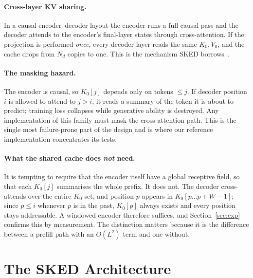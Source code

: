 \documentclass[10pt,conference]{IEEEtran}
\begin{document}
\paragraph{Cross-layer KV sharing.} In a causal encoder--decoder layout the encoder
runs a full causal pass and the decoder attends to the encoder's final-layer states
through cross-attention. If the projection is performed \emph{once}, every decoder
layer reads the same $K_0, V_0$, and the cache drops from $N_d$ copies to one. This is
the mechanism SKED borrows~\cite{yoco}.

\paragraph{The masking hazard.} The encoder is causal, so $K_0[j]$ depends only on
tokens $\leq j$. If decoder position $i$ is allowed to attend to $j > i$, it reads a
summary of the token it is about to predict; training loss collapses while generative
ability is destroyed. Any implementation of this family must mask the cross-attention
path. This is the single most failure-prone part of the design and is where our
reference implementation concentrates its tests.

\paragraph{What the shared cache does \emph{not} need.} It is tempting to require that
the encoder itself have a global receptive field, so that each $K_0[j]$ summarises the
whole prefix. It does not. The decoder cross-attends over the entire $K_0$ set, and
position $p$ appears in $K_0[p \dots p+W-1]$; since $p \leq i$ whenever $p$ is in the
past, $K_0[p]$ always exists and every position stays addressable. A windowed encoder
therefore suffices, and Section~\ref{sec:exp} confirms this by measurement. The
distinction matters because it is the difference between a prefill path with an
$O(L^2)$ term and one without.

\section{The SKED Architecture}\label{sec:arch}
\end{document}
